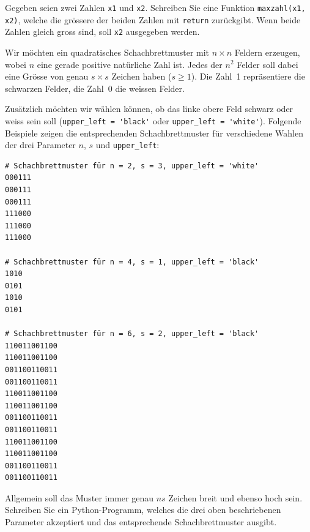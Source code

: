 \begin{myexercise}
	Gegeben seien zwei Zahlen \lstinline|x1| und \lstinline|x2|. Schreiben Sie eine Funktion \lstinline|maxzahl(x1, x2)|, welche die grössere der beiden Zahlen mit \lstinline|return| zurückgibt. Wenn beide Zahlen gleich gross sind, soll \lstinline|x2| ausgegeben werden.

	\begin{myanswer}
		
	\end{myanswer}
\end{myexercise}

\begin{mychallenge}


	Wir möchten ein quadratisches Schachbrettmuster mit $n \times n$ Feldern erzeugen, wobei $n$ eine gerade positive natürliche Zahl ist. Jedes der $n^2$ Felder soll dabei eine Grösse von genau $s \times s$ Zeichen haben ($s \geq 1$). Die Zahl~1 repräsentiere die schwarzen Felder, die Zahl~0 die weissen Felder.

	Zusätzlich möchten wir wählen können, ob das linke obere Feld schwarz oder weiss sein soll (\lstinline|upper_left = 'black'| oder \lstinline|upper_left = 'white'|). Folgende Beispiele zeigen die entsprechenden Schachbrettmuster für verschiedene Wahlen der drei Parameter $n$, $s$ und \lstinline|upper_left|:

	\begin{verbatim}
# Schachbrettmuster für n = 2, s = 3, upper_left = 'white'
000111
000111
000111
111000
111000
111000

# Schachbrettmuster für n = 4, s = 1, upper_left = 'black'
1010
0101
1010
0101

# Schachbrettmuster für n = 6, s = 2, upper_left = 'black'
110011001100
110011001100
001100110011
001100110011
110011001100
110011001100
001100110011
001100110011
110011001100
110011001100
001100110011
001100110011
\end{verbatim}

	Allgemein soll das Muster immer genau $ns$ Zeichen breit und ebenso hoch sein. Schreiben Sie ein Python-Programm, welches die drei oben beschriebenen Parameter akzeptiert und das entsprechende Schachbrettmuster ausgibt.
	\begin{myanswer}
		
	\end{myanswer}
\end{mychallenge}

